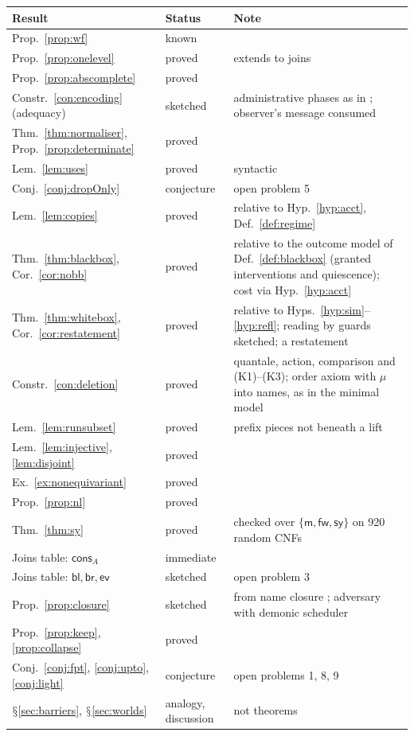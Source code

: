 \documentclass[11pt]{article}
\theoremstyle{definition}
\theoremstyle{plain}
\theoremstyle{remark}
\DeclareRobustCommand{\S}{\ifmmode\mathsection\else$\mathsection$\fi}
\newcommand{\cm}{\mathsf{m}}
\newcommand{\cfw}{\mathsf{fw}}
\newcommand{\csy}{\mathsf{sy}}
\newcommand{\cbl}{\mathsf{bl}}
\newcommand{\cbr}{\mathsf{br}}
\newcommand{\cev}{\mathsf{ev}}
\newcommand{\ccons}{\mathsf{cons}}
\begin{document}
\begin{center}
\begin{tabular}{@{}llp{}@{}}
\toprule
Result & Status & Note \\
\midrule
Prop.~\ref{prop:wf} & known & \cite{Scientist,NWNS,Lybech22} \\
Prop.~\ref{prop:onelevel} & proved & extends \cite{NWNS} to joins \\
Prop.~\ref{prop:abscomplete} & proved & \\
Constr.~\ref{con:encoding} (adequacy) & sketched & administrative phases as in \cite{NWNS}; observer's message consumed \\
Thm.~\ref{thm:normaliser}, Prop.~\ref{prop:determinate} & proved & \\
Lem.~\ref{lem:uses} & proved & syntactic \\
Conj.~\ref{conj:dropOnly} & conjecture & open problem 5 \\
Lem.~\ref{lem:copies} & proved & relative to Hyp.~\ref{hyp:acct}, Def.~\ref{def:regime} \\
Thm.~\ref{thm:blackbox}, Cor.~\ref{cor:nobb} & proved & relative to the outcome model of Def.~\ref{def:blackbox} (granted interventions and quiescence); cost via Hyp.~\ref{hyp:acct} \\
Thm.~\ref{thm:whitebox}, Cor.~\ref{cor:restatement} & proved & relative to Hyps.~\ref{hyp:sim}--\ref{hyp:refl}; reading by guards sketched; a restatement \\
Constr.~\ref{con:deletion} & proved & quantale, action, comparison and (K1)--(K3); order axiom with $\mu$ into names, as in the minimal model \\
Lem.~\ref{lem:runsubset} & proved & prefix pieces not beneath a lift \\
Lem.~\ref{lem:injective}, \ref{lem:disjoint} & proved & \\
Ex.~\ref{ex:nonequivariant} & proved & \\
Prop.~\ref{prop:nl} & proved & \\
Thm.~\ref{thm:sy} & proved & checked over $\{\cm,\cfw,\csy\}$ on 920 random CNFs \\
Joins table: $\ccons_A$ & immediate & \\
Joins table: $\cbl, \cbr, \cev$ & sketched & open problem 3 \\
Prop.~\ref{prop:closure} & sketched & from name closure \cite{RhoComb}; adversary with demonic scheduler \\
Prop.~\ref{prop:keep}, \ref{prop:collapse} & proved & \\
Conj.~\ref{conj:fpt}, \ref{conj:upto}, \ref{conj:light} & conjecture & open problems 1, 8, 9 \\
\S\ref{sec:barriers}, \S\ref{sec:worlds} & analogy, discussion & not theorems \\
\bottomrule
\end{tabular}
\end{center}
\end{document}
